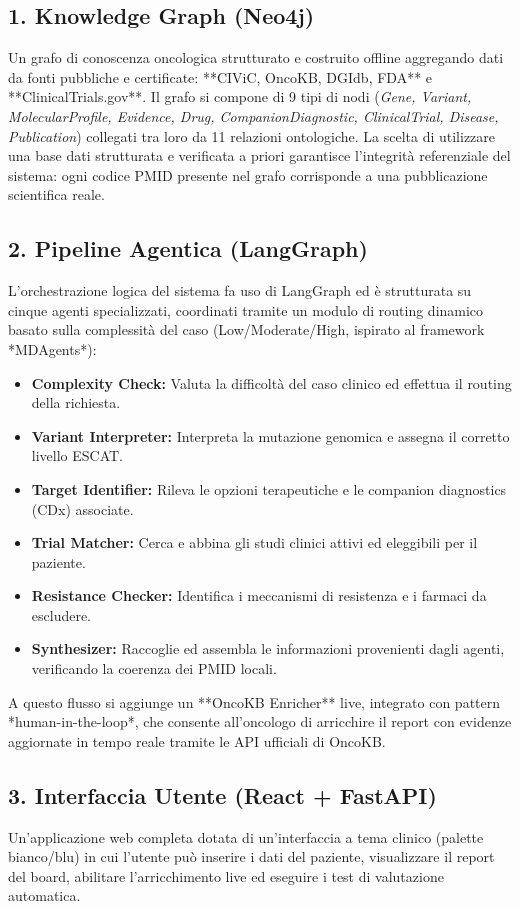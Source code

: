 \documentclass[12pt, a4paper]{article}
\begin{document}
\subsection{1. Knowledge Graph (Neo4j)}
Un grafo di conoscenza oncologica strutturato e costruito offline aggregando dati da fonti pubbliche e certificate: **CIViC, OncoKB, DGIdb, FDA** e **ClinicalTrials.gov**. Il grafo si compone di 9 tipi di nodi (\textit{Gene, Variant, MolecularProfile, Evidence, Drug, CompanionDiagnostic, ClinicalTrial, Disease, Publication}) collegati tra loro da 11 relazioni ontologiche. La scelta di utilizzare una base dati strutturata e verificata a priori garantisce l'integrità referenziale del sistema: ogni codice PMID presente nel grafo corrisponde a una pubblicazione scientifica reale.

\subsection{2. Pipeline Agentica (LangGraph)}
L'orchestrazione logica del sistema fa uso di LangGraph ed è strutturata su cinque agenti specializzati, coordinati tramite un modulo di routing dinamico basato sulla complessità del caso (Low/Moderate/High, ispirato al framework *MDAgents*):
\begin{itemize}[leftmargin=1.6em, itemsep=2pt]
  \item \textbf{Complexity Check:} Valuta la difficoltà del caso clinico ed effettua il routing della richiesta.
  \item \textbf{Variant Interpreter:} Interpreta la mutazione genomica e assegna il corretto livello ESCAT.
  \item \textbf{Target Identifier:} Rileva le opzioni terapeutiche e le companion diagnostics (CDx) associate.
  \item \textbf{Trial Matcher:} Cerca e abbina gli studi clinici attivi ed eleggibili per il paziente.
  \item \textbf{Resistance Checker:} Identifica i meccanismi di resistenza e i farmaci da escludere.
  \item \textbf{Synthesizer:} Raccoglie ed assembla le informazioni provenienti dagli agenti, verificando la coerenza dei PMID locali.
\end{itemize}
A questo flusso si aggiunge un **OncoKB Enricher** live, integrato con pattern *human-in-the-loop*, che consente all'oncologo di arricchire il report con evidenze aggiornate in tempo reale tramite le API ufficiali di OncoKB.

\subsection{3. Interfaccia Utente (React + FastAPI)}
Un'applicazione web completa dotata di un'interfaccia a tema clinico (palette bianco/blu) in cui l'utente può inserire i dati del paziente, visualizzare il report del board, abilitare l'arricchimento live ed eseguire i test di valutazione automatica.
\end{document}
